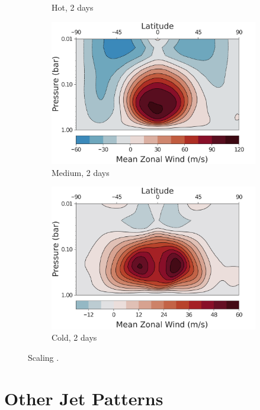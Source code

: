 \begin{figure}
\begin{subfigure}[b]{0.32\textwidth}
       \caption{Hot, 2 days}
     \end{subfigure}
     \begin{subfigure}[b]{0.32\textwidth}
       \includegraphics[width=\textwidth]{figures/eqm-zonal-flow/wind-med-2.pdf}
       \caption{Medium, 2 days}
     \end{subfigure}
     \begin{subfigure}[b]{0.32\textwidth}
       \includegraphics[width=\textwidth]{figures/eqm-zonal-flow/wind-cold-2.pdf}
       \caption{Cold, 2 days}
     \end{subfigure}
  \caption{Scaling \citep{pierrehumbert2018review}.}
  \label{fig:gcm-suite-jets}
\end{figure}

\section{Other Jet Patterns}

